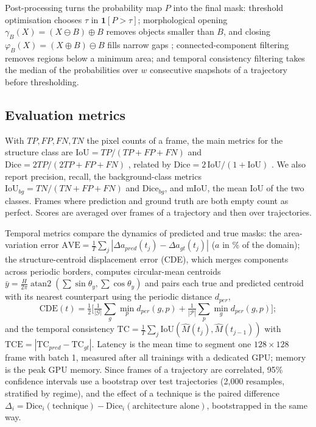 \documentclass[preprint,12pt,authoryear]{elsarticle}
\newcommand{\ind}{\mathbf{1}}
\begin{document}
Post-processing turns the probability map $P$ into the final mask: threshold optimisation chooses $\tau$ in $\ind[P>\tau]$; morphological opening $\gamma_B(X)=(X\ominus B)\oplus B$ removes objects smaller than $B$, and closing $\varphi_B(X)=(X\oplus B)\ominus B$ fills narrow gaps \citep{serra1982,soille2003}; connected-component filtering removes regions below a minimum area; and temporal consistency filtering takes the median of the probabilities over $w$ consecutive snapshots of a trajectory before thresholding.

\subsection{Evaluation metrics}
\label{sec:metrics}

With $TP,FP,FN,TN$ the pixel counts of a frame, the main metrics for the structure class are $\mathrm{IoU}=TP/(TP+FP+FN)$ \citep{jaccard1912} and $\mathrm{Dice}=2TP/(2TP+FP+FN)$ \citep{dice1945}, related by $\mathrm{Dice}=2\,\mathrm{IoU}/(1+\mathrm{IoU})$ \citep{taha2015,maierhein2024}. We also report precision, recall, the background-class metrics $\mathrm{IoU}_{bg}=TN/(TN+FP+FN)$ and $\mathrm{Dice}_{bg}$, and mIoU, the mean IoU of the two classes. Frames where prediction and ground truth are both empty count as perfect. Scores are averaged over frames of a trajectory and then over trajectories.

Temporal metrics compare the dynamics of predicted and true masks: the area-variation error $\mathrm{AVE}=\frac1T\sum_j|\Delta a_{pred}(t_j)-\Delta a_{gt}(t_j)|$ ($a$ in \% of the domain); the structure-centroid displacement error (CDE), which merges components across periodic borders, computes circular-mean centroids $\bar y=\frac{H}{2\pi}\operatorname{atan2}(\sum\sin\theta_y,\sum\cos\theta_y)$ and pairs each true and predicted centroid with its nearest counterpart using the periodic distance $d_{per}$,
\begin{equation}
\mathrm{CDE}(t)=\tfrac12\Big[\tfrac{1}{|\mathcal{G}|}\textstyle\sum_{g}\min_{p}d_{per}(g,p)+\tfrac{1}{|\mathcal{P}|}\sum_{p}\min_{g}d_{per}(g,p)\Big];
\end{equation}
and the temporal consistency $\mathrm{TC}=\frac1T\sum_j\mathrm{IoU}(\hat M(t_j),\hat M(t_{j-1}))$ with $\mathrm{TCE}=|\mathrm{TC}_{pred}-\mathrm{TC}_{gt}|$. Latency is the mean time to segment one $128\times128$ frame with batch 1, measured after all trainings with a dedicated GPU; memory is the peak GPU memory. Since frames of a trajectory are correlated, 95\% confidence intervals use a bootstrap over test trajectories \citep{efron1993} (2,000 resamples, stratified by regime), and the effect of a technique is the paired difference $\Delta_i=\mathrm{Dice}_i(\text{technique})-\mathrm{Dice}_i(\text{architecture alone})$, bootstrapped in the same way.
\end{document}

